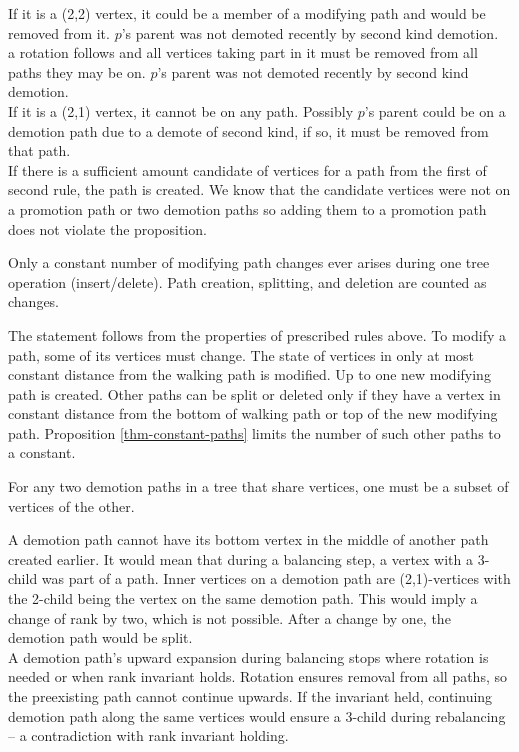 \begin{myproof}
If it is a (2,2) vertex, it could be a member of a modifying path and would be removed from it. $p$'s parent was not demoted recently by second kind demotion.\\a rotation follows and all vertices taking part in it must be removed from all paths they may be on. $p$'s parent was not demoted recently by second kind demotion.\\
If it is a (2,1) vertex, it cannot be on any path. Possibly $p$'s parent could be on a demotion path due to a demote of second kind, if so, it must be removed from that path.\\
If there is a sufficient amount candidate of vertices for a path from the first of second rule, the path is created. We know that the candidate vertices were not on a promotion path or two demotion paths so adding them to a promotion path does not violate the proposition.\\
\end{myproof}

\begin{prop}
Only a constant number of modifying path changes ever arises during one tree operation (insert/delete). Path creation, splitting, and deletion are counted as changes.
\end{prop}

\begin{myproof}
The statement follows from the properties of prescribed rules above. To modify a path, some of its vertices must change. The state of vertices in only at most constant distance from the walking path is modified. Up to one new modifying path is created. Other paths can be split or deleted only if they have a vertex in constant distance from the bottom of walking path or top of the new modifying path. Proposition \ref{thm-constant-paths} limits the number of such other paths to a constant.
\end{myproof}

\begin{prop}
For any two demotion paths in a tree that share vertices, one must be a subset of vertices of the other.
\end{prop}

\begin{myproof}
A demotion path cannot have its bottom vertex in the middle of another path created earlier. It would mean that during a balancing step, a vertex with a 3-child was part of a path. Inner vertices on a demotion path are (2,1)-vertices with the 2-child being the vertex on the same demotion path. This would imply a change of rank by two, which is not possible. After a change by one, the demotion path would be split.\\
A demotion path's upward expansion during balancing stops where rotation is needed or when rank invariant holds. Rotation ensures removal from all paths, so the preexisting path cannot continue upwards. If the invariant held, continuing demotion path along the same vertices would ensure a 3-child during rebalancing -- a contradiction with rank invariant holding. 
\end{myproof}

